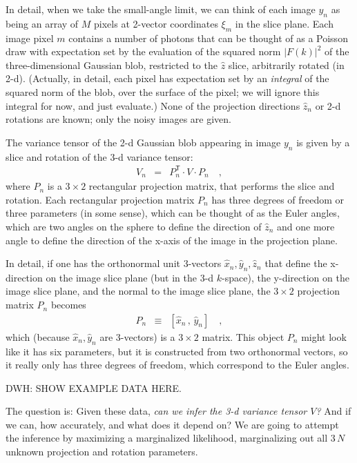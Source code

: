 \documentclass[12pt]{article}
\newcommand{\sqnorm}[1]{|{#1}|^2}
\newcommand{\unitvec}[1]{\hat{#1}}
\newcommand{\xhat}{\unitvec{x}}
\newcommand{\yhat}{\unitvec{y}}
\newcommand{\zhat}{\unitvec{z}}
\newcommand{\transpose}{^{\mathsf{T}}}
\begin{document}
In detail, when we take the small-angle limit, we can think of each
image $y_n$ as being an array of $M$ pixels at
2-vector coordinates $\xi_m$ in the slice plane.
Each image pixel $m$ contains a number of photons that can be thought
of as a Poisson draw with expectation set by the evaluation of the
squared norm $\sqnorm{F(k)}$ of the three-dimensional Gaussian
blob, restricted to the $\zhat$ slice, arbitrarily rotated (in 2-d).
(Actually, in detail, each pixel has expectation set by an
\emph{integral} of the squared norm of the blob, over the surface of
the pixel; we will ignore this integral for now, and just evaluate.)
None of the projection directions $\zhat_n$ or 2-d rotations are
known; only the noisy images are given.

The variance tensor of the 2-d Gaussian blob appearing in image $y_n$
is given by a slice and rotation of the 3-d variance tensor:
\begin{eqnarray}
  V_n &=& P_n\transpose\cdot V\cdot P_n
  \quad ,
\end{eqnarray}
where $P_n$ is a $3\times 2$ rectangular projection matrix, that
performs the slice and rotation.
Each rectangular projection matrix $P_n$ has three degrees of freedom or three
parameters (in some sense), which can be thought of as the Euler
angles, which are two angles on the sphere to define the direction of
$\zhat_n$ and one more angle to define the direction of the x-axis of
the image in the projection plane.

In detail, if one has the orthonormal unit 3-vectors
$\xhat_n,\yhat_n,\zhat_n$ that define the x-direction on the image
slice plane (but in the 3-d $k$-space), the y-direction on the image
slice plane, and the normal to the image slice plane, the $3\times 2$
projection matrix $P_n$ becomes
\begin{eqnarray}
  P_n &\equiv& [\xhat_n\,,\,\yhat_n]
  \quad ,
\end{eqnarray}
which (because $\xhat_n,\yhat_n$ are 3-vectors) is a $3\times2$ matrix.
This object $P_n$ might look like it has six parameters, but it is
constructed from two orthonormal vectors, so it really only has three
degrees of freedom, which correspond to the Euler angles.

DWH: SHOW EXAMPLE DATA HERE.

The question is:
Given these data, \emph{can we infer the 3-d variance tensor $V$?}
And if we can, how accurately, and what does it depend on?  We are
going to attempt the inference by maximizing a marginalized
likelihood, marginalizing out all $3\,N$ unknown projection and
rotation parameters.
\end{document}
